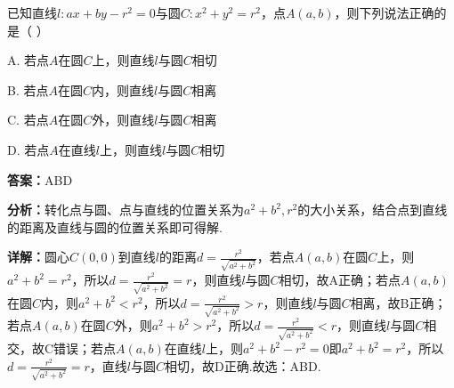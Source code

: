 \begin{question}[points=5]
已知直线$l:ax+by-r^2=0$与圆$C:x^2+y^2=r^2$，点$A(a,b)$，则下列说法正确的是（ ）
\begin{choices}
  \item A. 若点$A$在圆$C$上，则直线$l$与圆$C$相切
  \item B. 若点$A$在圆$C$内，则直线$l$与圆$C$相离
  \item C. 若点$A$在圆$C$外，则直线$l$与圆$C$相离
  \item D. 若点$A$在直线$l$上，则直线$l$与圆$C$相切
\end{choices}
\begin{solution}
\textbf{答案：}ABD

\textbf{分析：}转化点与圆、点与直线的位置关系为$a^2+b^2,r^2$的大小关系，结合点到直线的距离及直线与圆的位置关系即可得解.

\textbf{详解：}圆心$C(0,0)$到直线$l$的距离$d=\frac{r^2}{\sqrt{a^2+b^2}}$，若点$A(a,b)$在圆$C$上，则$a^2+b^2=r^2$，所以$d=\frac{r^2}{\sqrt{a^2+b^2}}=r$，则直线$l$与圆$C$相切，故A正确；若点$A(a,b)$在圆$C$内，则$a^2+b^2<r^2$，所以$d=\frac{r^2}{\sqrt{a^2+b^2}}>r$，则直线$l$与圆$C$相离，故B正确；若点$A(a,b)$在圆$C$外，则$a^2+b^2>r^2$，所以$d=\frac{r^2}{\sqrt{a^2+b^2}}<r$，则直线$l$与圆$C$相交，故C错误；若点$A(a,b)$在直线$l$上，则$a^2+b^2-r^2=0$即$a^2+b^2=r^2$，所以$d=\frac{r^2}{\sqrt{a^2+b^2}}=r$，直线$l$与圆$C$相切，故D正确.故选：ABD.
\end{solution}
\end{question}


